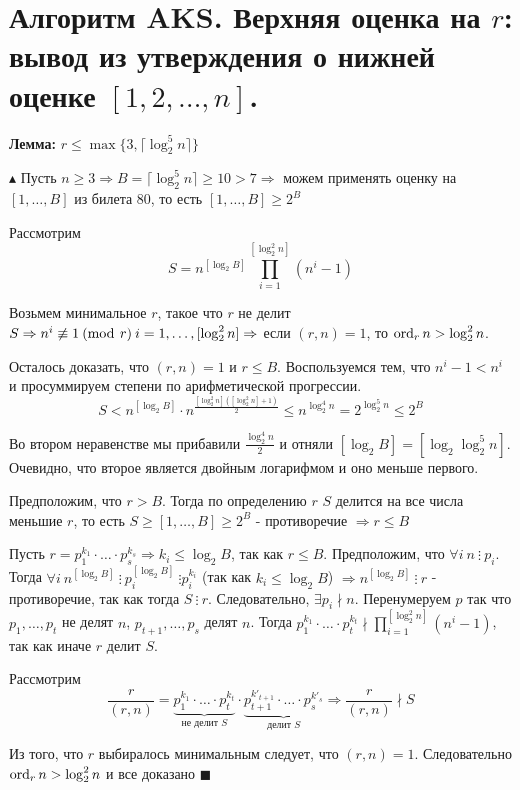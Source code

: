 \setcounter{section}{102}
\section{Алгоритм AKS. Верхняя оценка на $r$: вывод из утверждения о нижней оценке \texorpdfstring{$[1, 2, \ldots , n]$}{[1, 2, ..., n]}.}
\par \textbf{Лемма:} $r \leq \max\{3, \lceil \log_2^5 n \rceil\}$
\par $\blacktriangle$ Пусть $n \geq 3 \Rightarrow B=\lceil\log_2^5 n\rceil\geq 10>7 \Rightarrow$ можем применять оценку на $[1, \ldots, B]$ из билета 80, то есть $[1, \ldots, B] \geq 2^B$
\par Рассмотрим $$S=n^{\left[\log_2 B\right]}\prod_{i=1}^{\left[ \log_2^2 n \right]}(n^i-1)$$
\par Возьмем минимальное $r$, такое что $r$ не делит $S \Rightarrow n^i \not\equiv 1 \: (\operatorname{mod} \: r) \: i =1, \ldots, [\log_2^2 n] \Rightarrow$ если $(r,n)=1$, то $\operatorname{ord}_r n > \log_2^2 n$.
\par Осталось доказать, что $(r,n)=1$ и $r \leq B$. Воспользуемся тем, что $n^i-1<n^i$ и просуммируем степени по арифметической прогрессии.
$$S < n^{\left[\log_2 B\right]}\cdot n^\frac{\left[\log_2^2 n\right]\left(\left[\log_2^2 n\right]+1\right)}{2}\leq n^{\log_2^4n}=2^{\log_2^5 n} \leq 2^B$$
\par Во втором неравенстве мы прибавили $\frac{\log_2^4 n}{2}$ и отняли $[\log_2 B]=[\log_2 \log_2^5 n]$. Очевидно, что второе является двойным логарифмом и оно меньше первого.
\par Предположим, что  $r>B$. Тогда по определению $r$ $S$ делится на все числа меньшие $r$, то есть $S \geq [1, \ldots, B] \geq 2^B$ - противоречие $\Rightarrow r \leq B$
\par Пусть $r=p_1^{k_1}\cdot \ldots \cdot p_s^{k_s} \Rightarrow k_i \leq \log_2 B$, так как $r\leq B$. Предположим, что $\forall i \: n \: \vdots \: p_i$. Тогда $\forall i \: n^{[\log_2 B]} \: \vdots \: p_i^{[\log_2 B]} \: \vdots p_i^{k_i}$ (так как $k_i \leq \log_2 B$) $\Rightarrow n^{[\log_2 B]} \: \vdots \: r$ - противоречие, так как тогда $S \: \vdots \: r$. Следовательно, $\exists p_i \nmid n$. Перенумеруем $p$ так что $p_1, \ldots, p_t$ не делят $n$, $p_{t+1}, \ldots, p_s$ делят $n$. Тогда $p_1^{k_1} \cdot \ldots \cdot p_t^{k_t} \nmid \prod_{i=1}^{\left[ \log_2^2 n \right]}(n^i-1)$, так как иначе $r$ делит $S$.
\par Рассмотрим $$\frac{r}{(r,n)}=\underbrace{p_1^{k_1} \cdot \ldots \cdot p_t^{k_t}}_{\text{не делит } S} \cdot \underbrace{p_{t+1}^{k'_{t+1}} \cdot \ldots \cdot p_s^{k'_s}}_{\text{делит } S} \Rightarrow \frac{r}{(r,n)} \nmid S$$
\par Из того, что $r$ выбиралось минимальным следует, что $(r,n)=1$. Следовательно $\operatorname{ord}_r n > \log_2^2 n$ и все доказано $\blacksquare$